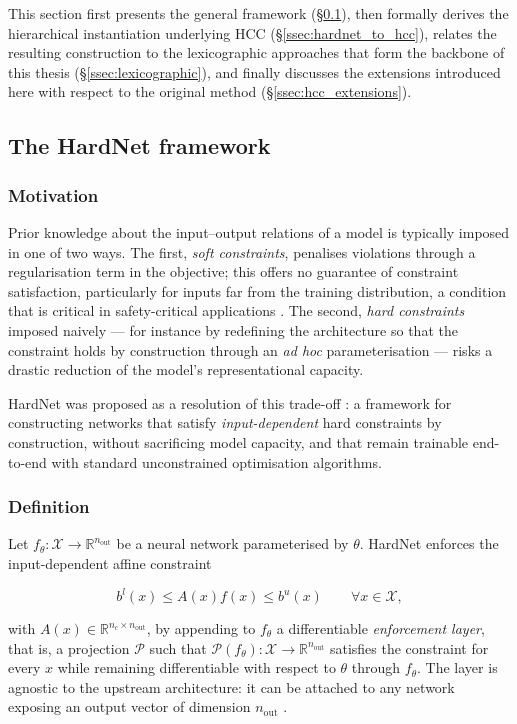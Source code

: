 This section first presents the general framework (\S\ref{ssec:hardnet}), then formally derives the hierarchical instantiation underlying HCC (\S\ref{ssec:hardnet_to_hcc}), relates the resulting construction to the lexicographic approaches that form the backbone of this thesis (\S\ref{ssec:lexicographic}), and finally discusses the extensions introduced here with respect to the original method (\S\ref{ssec:hcc_extensions}).

\subsection{The HardNet framework}
\label{ssec:hardnet}

\subsubsection{Motivation}

Prior knowledge about the input--output relations of a model is typically imposed in one of two ways. The first, \emph{soft constraints}, penalises violations through a regularisation term in the objective; this offers no guarantee of constraint satisfaction, particularly for inputs far from the training distribution, a condition that is critical in safety-critical applications \cite{min2024hardnet}. The second, \emph{hard constraints} imposed naively --- for instance by redefining the architecture so that the constraint holds by construction through an \emph{ad hoc} parameterisation --- risks a drastic reduction of the model's representational capacity.

HardNet was proposed as a resolution of this trade-off \cite{min2024hardnet}: a framework for constructing networks that satisfy \emph{input-dependent} hard constraints by construction, without sacrificing model capacity, and that remain trainable end-to-end with standard unconstrained optimisation algorithms.

\subsubsection{Definition}

Let $f_\theta:\mathcal{X}\to\mathbb{R}^{n_{\mathrm{out}}}$ be a neural network parameterised by $\theta$. HardNet enforces the input-dependent affine constraint

\[
b^l(x)\le A(x)f(x)\le b^u(x)\qquad\forall x\in\mathcal{X},
\]

with $A(x)\in\mathbb{R}^{n_c\times n_{\mathrm{out}}}$, by appending to $f_\theta$ a differentiable \emph{enforcement layer}, that is, a projection $\mathcal{P}$ such that $\mathcal{P}(f_\theta):\mathcal{X}\to\mathbb{R}^{n_{\mathrm{out}}}$ satisfies the constraint for every $x$ while remaining differentiable with respect to $\theta$ through $f_\theta$. The layer is agnostic to the upstream architecture: it can be attached to any network exposing an output vector of dimension $n_{\mathrm{out}}$ \cite{min2024hardnet}.

